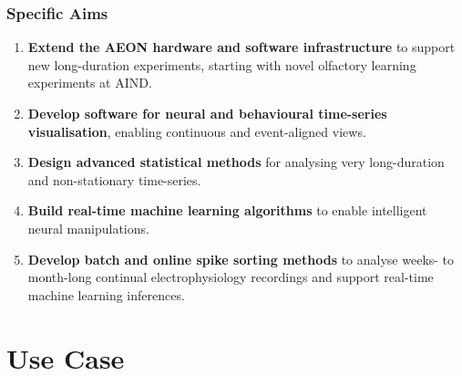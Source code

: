 \documentclass{beamer}
\begin{document}
\begin{frame}
    \frametitle{Specific Aims}

    \begin{enumerate}

        \item \textbf{Extend the AEON hardware and software infrastructure} to
            support new long-duration experiments, starting with novel
            olfactory learning experiments at AIND.

        \item \textbf{Develop software for neural and behavioural time-series
            visualisation}, enabling continuous and event-aligned views.

        \item \textbf{Design advanced statistical methods} for analysing very
            long-duration and non-stationary time-series.

        \item \textbf{Build real-time machine learning algorithms} to
            enable intelligent neural manipulations.

        \item \textbf{Develop batch and online spike sorting methods} to
            analyse weeks- to month-long continual electrophysiology recordings
            and support real-time machine learning inferences.

    \end{enumerate}

\end{frame}

\section{Use Case}
\end{document}
